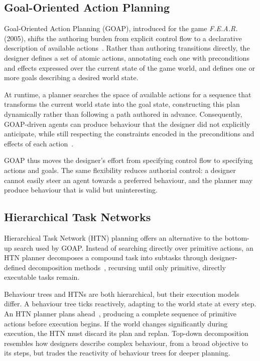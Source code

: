 \subsection{Goal-Oriented Action Planning}
\label{sec:goap}
 
Goal-Oriented Action Planning (GOAP), introduced for the game \textit{F.E.A.R.} (2005), shifts the authoring burden from explicit control flow to a declarative description of available actions~\cite{Orkin2006}. Rather than authoring transitions directly, the designer defines a set of atomic actions, annotating each one with preconditions and effects expressed over the current state of the game world, and defines one or more goals describing a desired world state.
 
At runtime, a planner searches the space of available actions for a sequence that transforms the current world state into the goal state, constructing this plan dynamically rather than following a path authored in advance. Consequently, GOAP-driven agents can produce behaviour that the designer did not explicitly anticipate, while still respecting the constraints encoded in the preconditions and effects of each action~\cite{Orkin2006}. 
 
GOAP thus moves the designer's effort from specifying control flow to specifying actions and goals. The same flexibility reduces authorial control: a designer cannot easily steer an agent towards a preferred behaviour, and the planner may produce behaviour that is valid but uninteresting.
 
\subsection{Hierarchical Task Networks}
\label{sec:htn}
 
Hierarchical Task Network (HTN) planning offers an alternative to the bottom-up search used by GOAP. Instead of searching directly over primitive actions, an HTN planner decomposes a compound task into subtasks through designer-defined decomposition methods~\cite{Erol1994}, recursing until only primitive, directly executable tasks remain.
 
Behaviour trees and HTNs are both hierarchical, but their execution models differ. A behaviour tree ticks reactively, adapting to the world state at every step. An HTN planner plans ahead~\cite{Kedalo2023}, producing a complete sequence of primitive actions before execution begins. If the world changes significantly during execution, the HTN must discard its plan and replan. Top-down decomposition resembles how designers describe complex behaviour, from a broad objective to its steps, but trades the reactivity of behaviour trees for deeper planning.
 
